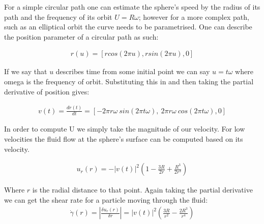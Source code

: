 For a simple circular path one can estimate the sphere's speed by the 
radius of its path and the frequency of its orbit $U = R\omega$; however 
for a more complex path, such as an elliptical orbit the curve needs 
to be parametrised. One can describe the position parameter of a circular 
path as such:

\begin{align}
	r(u) = \left[rcos(2\pi u), rsin(2\pi u), 0 \right]
\end{align}

If we say that $u$ describes time from some initial point we can say $u=t\omega$ 
where omega is the frequency of orbit. Substituting this in and then taking 
the partial derivative of position gives:

\begin{align}
	v(t) = \frac{dr(t)}{dt} = \left[-2\pi r\omega \ sin(2\pi t\omega),
	\ 2\pi r\omega \ cos(2\pi t\omega), 0 \right]
\end{align}

In order to compute U we simply take the magnitude of our velocity. 
For low velocities the fluid flow at the sphere's surface can be computed 
based on its velocity.

\begin{align}
	u_r(r)=-|v(t)|^2\left(1-\frac{3R}{2r}+\frac{R^3}{2r^3}\right)
\end{align}

Where $r$ is the radial distance to that point. Again taking the partial 
derivative we can get the shear rate for a particle moving through the fluid:
\begin{align}
	\dot{\gamma}(r) = \left| \frac{\delta u_r(r)}{\delta r}\right| = |v(t)|^2\left(\frac{3R}{r^2} -\frac{2R^3}{r^4} \right)
	\label{eq:galvo_shear}
\end{align}

